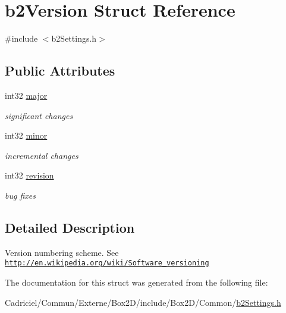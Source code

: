 \hypertarget{structb2_version}{}\section{b2\+Version Struct Reference}
\label{structb2_version}


{\ttfamily \#include $<$b2\+Settings.\+h$>$}

\subsection*{Public Attributes}
\begin{DoxyCompactItemize}
\item 
int32 \hyperlink{structb2_version_a720da8e346364d1cb34d176125380b44}{major}\hypertarget{structb2_version_a720da8e346364d1cb34d176125380b44}{}\label{structb2_version_a720da8e346364d1cb34d176125380b44}

\begin{DoxyCompactList}\small\item\em significant changes \end{DoxyCompactList}\item 
int32 \hyperlink{structb2_version_a115b8797a6e0b8e53f54502bd20d89da}{minor}\hypertarget{structb2_version_a115b8797a6e0b8e53f54502bd20d89da}{}\label{structb2_version_a115b8797a6e0b8e53f54502bd20d89da}

\begin{DoxyCompactList}\small\item\em incremental changes \end{DoxyCompactList}\item 
int32 \hyperlink{structb2_version_a395cfe1434e348115d2ead3d72b88847}{revision}\hypertarget{structb2_version_a395cfe1434e348115d2ead3d72b88847}{}\label{structb2_version_a395cfe1434e348115d2ead3d72b88847}

\begin{DoxyCompactList}\small\item\em bug fixes \end{DoxyCompactList}\end{DoxyCompactItemize}


\subsection{Detailed Description}
Version numbering scheme. See \href{http://en.wikipedia.org/wiki/Software_versioning}{\tt http\+://en.\+wikipedia.\+org/wiki/\+Software\+\_\+versioning} 

The documentation for this struct was generated from the following file\+:\begin{DoxyCompactItemize}
\item 
Cadriciel/\+Commun/\+Externe/\+Box2\+D/include/\+Box2\+D/\+Common/\hyperlink{b2_settings_8h}{b2\+Settings.\+h}\end{DoxyCompactItemize}
